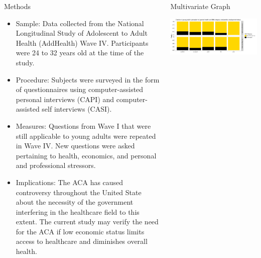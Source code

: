 \documentclass[final]{beamer}\usepackage[]{graphicx}\usepackage[]{color}
\makeatletter
\def\maxwidth{ %
  \ifdim\Gin@nat@width>\linewidth
    \linewidth
  \else
    \Gin@nat@width
  \fi
}
\newenvironment{knitrout}{}{} %
\makeatother
\begin{document}
\begin{frame}[fragile]
\begin{columns}[t]
\begin{column}{0.31\linewidth}
\begin{minipage}[t][.955\textheight]{\linewidth}
\begin{block}{Methods}
\begin{itemize}
\item Sample: Data collected from the National Longitudinal Study of Adolescent to Adult Health (AddHealth) Wave IV. Participants were 24 to 32 years old at the time of the study.
\item Procedure: Subjects were surveyed in the form of questionnaires using computer-assisted personal interviews (CAPI) and computer-assisted self interviews (CASI).
\item Measures: Questions from Wave I that were still applicable to young adults were repeated in Wave IV. New questions were asked pertaining to health, economics, and personal and professional stressors.
\item Implications: The ACA has caused controversy throughout the United State about the necessity of the government interfering in the healthcare field to this extent. The current study may verify the need for the ACA if low economic status limits access to healthcare and diminishes overall health.
\end{itemize}
\vspace{0ex}
\vfill
\end{block}
\vfill


\end{minipage}
\end{column}%


\begin{column}{0.31\linewidth}
\begin{minipage}[t][.955\textheight]{\linewidth} 

\begin{block}{Multivariate Graph}


\begin{knitrout}
\color{fgcolor}

{\centering \includegraphics[width=\maxwidth]{figure/MulitvariateGraph-1} 

}
\end{knitrout}
\end{block}
\end{minipage}
\end{column}
\end{columns}
\end{frame}
\end{document}
